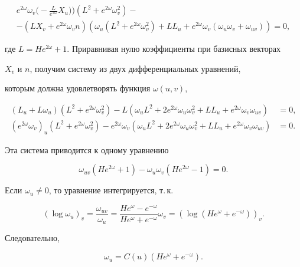 \begin{pf}
\begin{multline*}
e^{2\omega}\omega_v\bigg(-\frac{L}{e^{2\omega}}X_u\bigg)\bigg)


(L^2+e^{2\omega}\omega_v^2)-\\


-(LX_v+e^{2\omega}\omega_vn)(\omega_u(L^2+e^{2\omega}\omega_v^2)+LL_u+


e^{2\omega}\omega_v(\omega_u\omega_v+\omega_{uv}))=0,


\end{multline*}


где $L=He^{2\omega}+1$. Приравнивая нулю коэффициенты при базисных векторах


$X_v$ и $n$, получим систему из двух дифференциальных уравнений,


которым должна удовлетворять функция $\omega (u,v)$,


\begin{align*}


(L_u+L\omega_u)(L^2+e^{2\omega}\omega_v^2)-L(\omega_uL^2+


2e^{2\omega}\omega_u\omega_v^2+LL_u+e^{2\omega}\omega_v\omega_{uv})&=0,\\


(e^{2\omega}\omega_v)_u(L^2+e^{2\omega}\omega^2_v)-e^{2\omega}\omega_v


(\omega_uL^2+2e^{2\omega}\omega_u\omega_v^2+LL_u+e^{2\omega}\omega_v


\omega_{uv})&=0.


\end{align*}


Эта система приводится к одному уравнению


$$


\omega_{uv}(He^{2\omega}+1)-\omega_u\omega_v(He^{2\omega}-1)=0.


$$


Если $\omega_u \ne0$, то уравнение интегрируется, т.\,к.


$$


(\log \omega_u)_v=\frac{\omega_{uv}}{\omega_u}=\frac{He^{\omega}-e^{-\omega}}


{He^{\omega}+e^{-\omega}}\omega_v=(\log (He^{\omega}+e^ {-\omega}))_v.


$$


Следовательно,


\begin{equation}


\omega_u=C(u)(He^{\omega}+e^{-\omega}).


\end{equation}






\end{pf}
